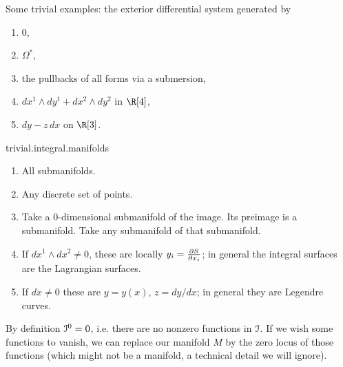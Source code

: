 \begin{example}
Some trivial examples: the exterior differential system generated by
\begin{enumerate}
\item \(0\),
\item \(\Omega^*\), 
\item the pullbacks of all forms via a submersion,
\item \(dx^1 \wedge dy^1 + dx^2 \wedge dy^2\) in \(\R[4]\),
\item \(dy-z \,dx\) on \(\R[3]\).
\end{enumerate}
\end{example}

%
\begin{answer}{trivial.integral.manifolds}%
\begin{enumerate}
\item All submanifolds.
\item Any discrete set of points. 
\item Take a \(0\)-dimensional submanifold of the image.
Its preimage is a submanifold. 
Take any submanifold of that submanifold.
\item If \(dx^1 \wedge dx^2 \ne 0\), these are locally \(y_i=\pderiv{S}{x_i}\); in general the integral surfaces are the Lagrangian surfaces.
\item If \(dx\ne 0\) these are \(y=y(x)\), \(z=dy/dx\); in general they are Legendre curves.
\end{enumerate}
\end{answer}

By definition \(\mathcal{I}^0=0\), i.e. there are no nonzero functions in \(\mathcal{I}\).
If we wish some functions to vanish, we can replace our manifold \(M\) by the zero locus of those functions (which might not be a manifold, a technical detail we will ignore).


